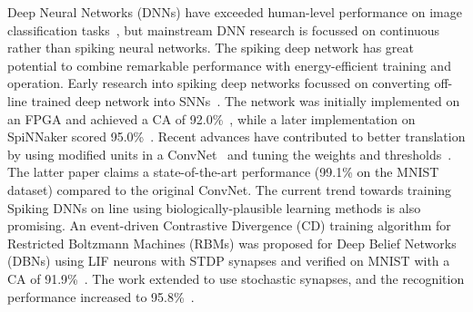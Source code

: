 Deep Neural Networks (DNNs) have exceeded human-level performance on image classification tasks~\citep{he2015delving}, but mainstream DNN research is focussed on continuous rather than spiking neural networks.
The spiking deep network has great potential to combine remarkable performance with energy-efficient training and operation.
Early research into spiking deep networks focussed on converting off-line trained deep network into SNNs~\citep{o2013real}.
The network was initially implemented on an FPGA and achieved a CA of 92.0\%~\citep{neil2014minitaur}, while a later implementation on SpiNNaker scored 95.0\%~\citep{Stromatias2015scalable}.
Recent advances have contributed to better translation by using modified units in a ConvNet~\citep{cao2015spiking} and tuning the weights and thresholds~\citep{diehl2015fast}.
The latter paper claims a state-of-the-art performance (99.1\% on the MNIST dataset) compared to the original ConvNet.
The current trend towards training Spiking DNNs on line using biologically-plausible learning methods is also promising.
An event-driven Contrastive Divergence (CD) training algorithm for Restricted Boltzmann Machines (RBMs) was proposed for Deep Belief Networks (DBNs) using LIF neurons with STDP synapses and verified on MNIST with a CA of 91.9\%~\citep{neftci2013event}.
The work extended to use stochastic synapses, and the recognition performance increased to 95.8\%~\citep{neftci2016stochastic}.


